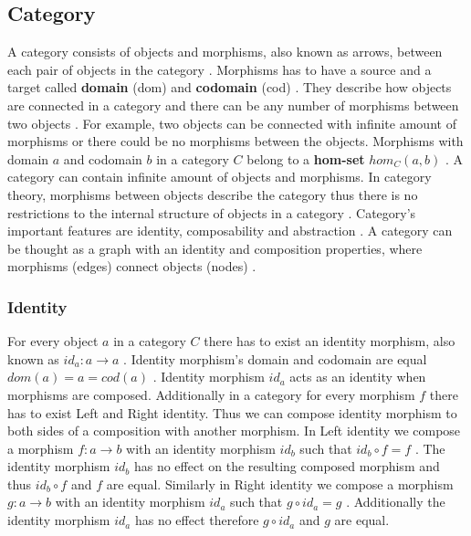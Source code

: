 \documentclass[article]{aaltoseries}
\begin{document}

  \subsection{Category}
  A category consists of objects and morphisms, also known as arrows, between
  each pair of objects in the category \cite{barr1990category,
    mac2013categories}. Morphisms has to have a source and a target called
  \textbf{domain} (dom) and \textbf{codomain} (cod) \cite{awodey2006category,
    barr1990category, mac2013categories}. They describe how objects are
  connected in a category and there can be any number of morphisms between two
  objects \cite{computational, barr1990category}. For example, two objects can
  be connected with infinite amount of morphisms or there could be no morphisms
  between the objects. Morphisms with domain $a$ and codomain $b$ in a category
  $C$ belong to a \textbf{hom-set} $hom_C(a, b)$ \cite{mac2013categories,
    barr1990category}. A category can contain infinite amount of objects and
  morphisms. In category theory, morphisms between objects describe the category
  thus there is no restrictions to the internal structure of objects in a
  category \cite{computational}. Category’s important features are identity,
  composability and abstraction \cite{barr1990category, awodey2006category}. A
  category can be thought as a graph with an identity and composition
  properties, where morphisms (edges) connect objects (nodes)
  \cite{barr1990category}.


  \subsubsection{Identity}
    For every object $a$ in a category $C$ there has to exist an identity
    morphism, also known as $id_a: a \rightarrow a$ \cite{mac2013categories,
      computational}. Identity morphism’s domain and codomain are equal $dom(a)
    = a = cod(a)$ \cite{mac2013categories}. Identity morphism $id_a$ acts as an
    identity when morphisms are composed. Additionally in a category for every
    morphism $f$ there has to exist Left and Right identity. Thus we can compose
    identity morphism to both sides of a composition with another morphism. In
    Left identity we compose a morphism $f: a \rightarrow b$ with an identity
    morphism $id_b$ such that $id_b \circ f = f$ \cite{computational,
      barr1990category}. The identity morphism $id_b$ has no effect on the
    resulting composed morphism and thus $id_b \circ f$ and $f$ are equal.
    Similarly in Right identity we compose a morphism $g: a \rightarrow b$ with
    an identity morphism $id_a$ such that $g \circ id_a = g$
    \cite{computational, barr1990category}. Additionally the identity morphism
    $id_a$ has no effect therefore $g \circ id_a$ and $g$ are equal.
 
\end{document}
